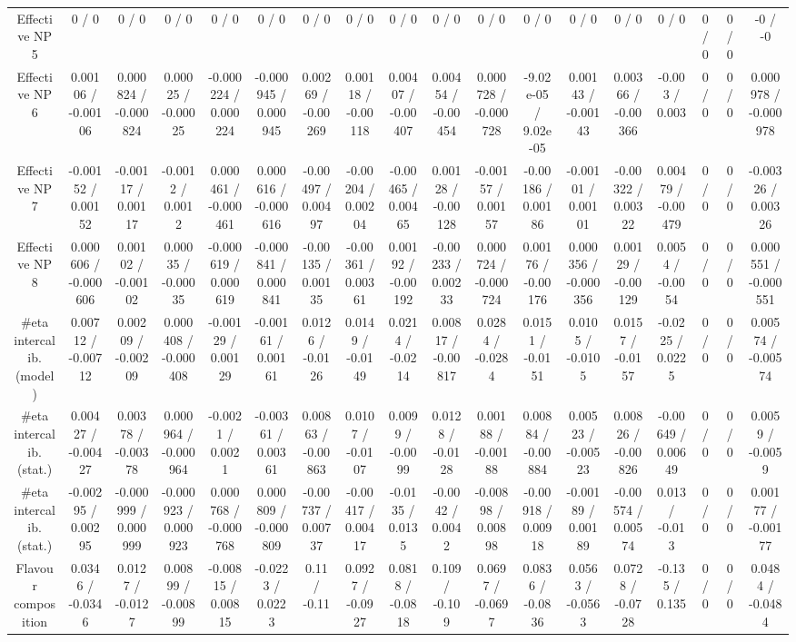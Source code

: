 \documentclass[10pt]{article}
\begin{document}
\begin{table}[htbp]
\begin{center}
\begin{tabular}{|c|c|c|c|c|c|c|c|c|c|c|c|c|c|c|c|c|c|}
  Effective NP 5 & 0 / 0 & 0 / 0 & 0 / 0 & 0 / 0 & 0 / 0 & 0 / 0 & 0 / 0 & 0 / 0 & 0 / 0 & 0 / 0 & 0 / 0 & 0 / 0 & 0 / 0 & 0 / 0 & 0 / 0 & 0 / 0 & -0 / -0 \\ 
  Effective NP 6 & 0.00106 / -0.00106 & 0.000824 / -0.000824 & 0.00025 / -0.00025 & -0.000224 / 0.000224 & -0.000945 / 0.000945 & 0.00269 / -0.00269 & 0.00118 / -0.00118 & 0.00407 / -0.00407 & 0.00454 / -0.00454 & 0.000728 / -0.000728 & -9.02e-05 / 9.02e-05 & 0.00143 / -0.00143 & 0.00366 / -0.00366 & -0.003 / 0.003 & 0 / 0 & 0 / 0 & 0.000978 / -0.000978 \\ 
  Effective NP 7 & -0.00152 / 0.00152 & -0.00117 / 0.00117 & -0.0012 / 0.0012 & 0.000461 / -0.000461 & 0.000616 / -0.000616 & -0.00497 / 0.00497 & -0.00204 / 0.00204 & -0.00465 / 0.00465 & 0.00128 / -0.00128 & -0.00157 / 0.00157 & -0.00186 / 0.00186 & -0.00101 / 0.00101 & -0.00322 / 0.00322 & 0.00479 / -0.00479 & 0 / 0 & 0 / 0 & -0.00326 / 0.00326 \\ 
  Effective NP 8 & 0.000606 / -0.000606 & 0.00102 / -0.00102 & 0.00035 / -0.00035 & -0.000619 / 0.000619 & -0.000841 / 0.000841 & -0.00135 / 0.00135 & -0.00361 / 0.00361 & 0.00192 / -0.00192 & -0.00233 / 0.00233 & 0.000724 / -0.000724 & 0.00176 / -0.00176 & 0.000356 / -0.000356 & 0.00129 / -0.00129 & 0.0054 / -0.0054 & 0 / 0 & 0 / 0 & 0.000551 / -0.000551 \\ 
  #eta intercalib. (model) & 0.00712 / -0.00712 & 0.00209 / -0.00209 & 0.000408 / -0.000408 & -0.00129 / 0.00129 & -0.00161 / 0.00161 & 0.0126 / -0.0126 & 0.0149 / -0.0149 & 0.0214 / -0.0214 & 0.00817 / -0.00817 & 0.0284 / -0.0284 & 0.0151 / -0.0151 & 0.0105 / -0.0105 & 0.0157 / -0.0157 & -0.0225 / 0.0225 & 0 / 0 & 0 / 0 & 0.00574 / -0.00574 \\ 
  #eta intercalib. (stat.) & 0.00427 / -0.00427 & 0.00378 / -0.00378 & 0.000964 / -0.000964 & -0.0021 / 0.0021 & -0.00361 / 0.00361 & 0.00863 / -0.00863 & 0.0107 / -0.0107 & 0.0099 / -0.0099 & 0.0128 / -0.0128 & 0.00188 / -0.00188 & 0.00884 / -0.00884 & 0.00523 / -0.00523 & 0.00826 / -0.00826 & -0.00649 / 0.00649 & 0 / 0 & 0 / 0 & 0.0059 / -0.0059 \\ 
  #eta intercalib. (stat.) & -0.00295 / 0.00295 & -0.000999 / 0.000999 & -0.000923 / 0.000923 & 0.000768 / -0.000768 & 0.000809 / -0.000809 & -0.00737 / 0.00737 & -0.00417 / 0.00417 & -0.0135 / 0.0135 & -0.0042 / 0.0042 & -0.00898 / 0.00898 & -0.00918 / 0.00918 & -0.00189 / 0.00189 & -0.00574 / 0.00574 & 0.013 / -0.013 & 0 / 0 & 0 / 0 & 0.00177 / -0.00177 \\ 
  Flavour composition & 0.0346 / -0.0346 & 0.0127 / -0.0127 & 0.00899 / -0.00899 & -0.00815 / 0.00815 & -0.0223 / 0.0223 & 0.11 / -0.11 & 0.0927 / -0.0927 & 0.0818 / -0.0818 & 0.109 / -0.109 & 0.0697 / -0.0697 & 0.0836 / -0.0836 & 0.0563 / -0.0563 & 0.0728 / -0.0728 & -0.135 / 0.135 & 0 / 0 & 0 / 0 & 0.0484 / -0.0484 \\ 

\end{tabular}
\end{center}
\end{table}
\end{document}
